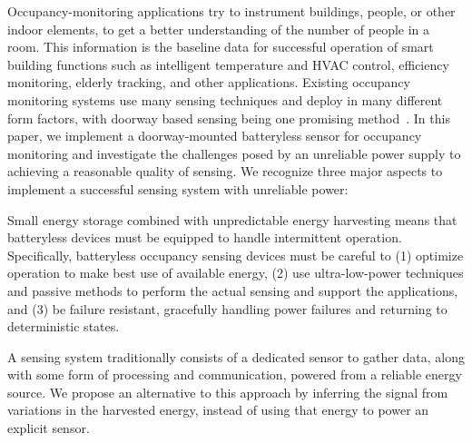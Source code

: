 Occupancy-monitoring applications try to instrument  buildings, people, or other indoor elements, to get a better understanding of the number of people in a room.
This information is the baseline data for successful operation of smart building functions such as intelligent temperature and HVAC control, efficiency monitoring, elderly tracking, and other applications.
Existing occupancy monitoring systems use many sensing techniques and deploy in many different form factors, with doorway based sensing being one promising method~\cite{hnat2012doorjamb, sonicdoor-buildsys2017}.
In this paper, we implement a doorway-mounted batteryless sensor for occupancy monitoring and investigate the challenges posed by an unreliable power supply to achieving a reasonable quality of sensing.
We recognize three major aspects to implement a successful sensing system with unreliable power:

Small energy storage combined with unpredictable energy harvesting means that batteryless devices must be equipped to handle intermittent operation.
Specifically, batteryless occupancy sensing devices must be careful to (1) optimize operation to make best use of available energy, (2) use ultra-low-power techniques and passive methods to perform the actual sensing and support the applications, and (3) be failure resistant, gracefully handling power failures and returning to deterministic states.

A sensing system traditionally consists of a dedicated sensor to gather data, along with some form of processing and communication, powered from a reliable energy source.
We propose an alternative to this approach by inferring the signal from variations in the harvested energy, instead of using that energy to power an explicit sensor.  

